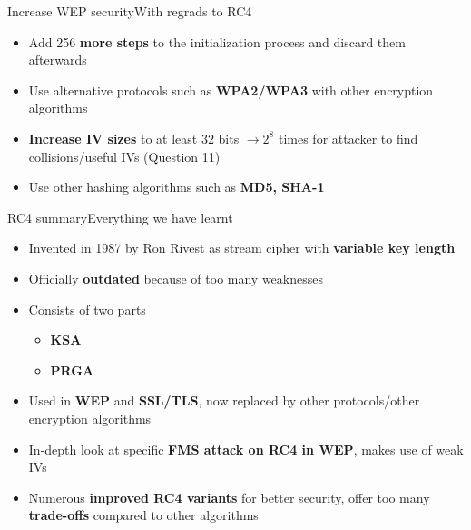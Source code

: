 \documentclass[
	aspectratio=169,	%
	onlytextwidth,		%
	t					%
	]{beamer}
\begin{document}
\begin{frame}[fragile]{Increase WEP security}{With regrads to RC4}
	\begin{itemize}
		\item Add 256 \textbf{more steps} to the initialization process and discard them afterwards
		\item Use alternative protocols such as \textbf{WPA2/WPA3} with other encryption algorithms
		\item \textbf{Increase IV sizes} to at least $32$ bits $\rightarrow 2^{8}$ times for attacker to find collisions/useful IVs (Question 11)
		\item Use other hashing algorithms such as \textbf{MD5, SHA-1}
	\end{itemize}
\end{frame}

\begin{frame}[fragile]{RC4 summary}{Everything we have learnt}
	\begin{itemize}
		\item Invented in 1987 by Ron Rivest as stream cipher with \textbf{variable key length}
		\item Officially \textbf{outdated} because of too many weaknesses
		\item Consists of two parts
		\begin{itemize}
			\item \textbf{KSA}
			\item \textbf{PRGA}
		\end{itemize}
		\item Used in \textbf{WEP} and \textbf{SSL/TLS}, now replaced by other protocols/other encryption algorithms
		\item In-depth look at specific \textbf{FMS attack on RC4 in WEP}, makes use of weak IVs
		\item Numerous \textbf{improved RC4 variants} for better security, offer too many \textbf{trade-offs} compared to other algorithms
	\end{itemize}
\end{frame}
\appendix

\makethankyou

\begin{frame}
	\printbibliography
\end{frame}
\end{document}
